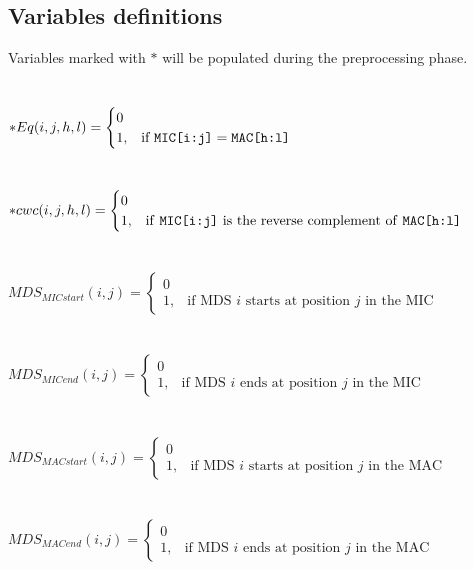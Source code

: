\subsection{Variables definitions}

Variables marked with $*$ will be populated during the preprocessing phase. \\\\\\
$*Eq(i,j,h,l) = \begin{cases} 0 \\ 1, & \mbox{if } \texttt{MIC[i:j]} = \texttt{MAC[h:l]} \end{cases}$ \\\\\\
$*cwc(i,j,h,l) = \begin{cases} 0 \\ 1, & \mbox{if \texttt{MIC[i:j]} is the reverse complement of \texttt{MAC[h:l]}} \end{cases}$ \\\\\\
$MDS_{MICstart}(i,j) = \begin{cases} 0 \\ 1, & \mbox{if MDS } i\mbox{ starts at position } j \mbox{ in the MIC} \end{cases}$ \\\\\\
$MDS_{MICend}(i,j) = \begin{cases} 0 \\ 1, & \mbox{if MDS } i\mbox{ ends at position } j \mbox{ in the MIC} \end{cases}$ \\\\\\
$MDS_{MACstart}(i,j) = \begin{cases} 0 \\ 1, & \mbox{if MDS } i\mbox{ starts at position } j \mbox{ in the MAC} \end{cases}$ \\\\\\
$MDS_{MACend}(i,j) = \begin{cases} 0 \\ 1, & \mbox{if MDS } i\mbox{ ends at position } j \mbox{ in the MAC} \end{cases}$ \\\\\\

